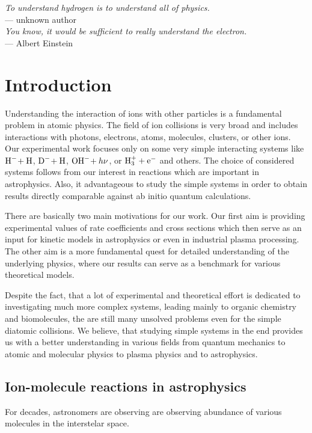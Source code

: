 \begin{flushright}
\textsl{To understand hydrogen is to understand all of physics.}\\
 \medskip{}
 --- unknown author \\
\bigskip{}
\textsl{You know, it would be sufficient to really understand the electron.}\\
 \medskip{}
 --- Albert Einstein
\par\end{flushright}

\bigskip{}
\begingroup
\let\clearpage\relax
\let\cleardoublepage\relax


\chapter{Introduction}

\label{ch:Introduction}
Understanding the interaction of ions with other particles is a
fundamental problem in atomic physics. The field of ion collisions
is very broad and includes interactions with photons, electrons,
atoms, molecules, clusters, or other ions. Our experimental work
focuses only on some very simple interacting systems like
${\text{H}^-\!}+{\text{H}}$,
${\text{D}^-\!}+{\text{H}}$, ${\text{OH}^-\!}+h\nu$, or ${\text{H}^+_3}+{\text{e}^-}$ and others. The
choice of considered systems follows from our interest in reactions
which are important in astrophysics. Also, it advantageous to study
the simple systems in order to obtain results directly comparable
against ab initio quantum calculations.

There are basically two main motivations for our work. Our first
aim is providing experimental values of rate coefficients and
cross sections which then serve as an input for kinetic models
in astrophysics or even in industrial plasma processing. The
other aim is a more fundamental quest for detailed understanding
of the underlying physics, where our results can serve as a benchmark
for various theoretical models.

Despite the fact, that a lot of experimental and theoretical effort
is dedicated to investigating much more complex systems, leading
mainly to organic chemistry and biomolecules, the are still many
unsolved problems even for the simple diatomic collisions. We
believe, that studying simple systems in the end provides
us with a better understanding in various fields from quantum mechanics
to atomic and molecular physics to plasma physics and to astrophysics.

\section{Ion-molecule reactions in astrophysics}
For decades, astronomers are observing are observing abundance of
various molecules in the interstelar space.


